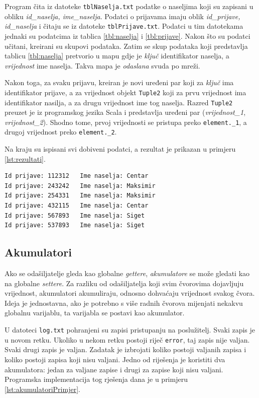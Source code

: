 \documentclass[times, utf8, zavrsni, numeric]{fer}
\begin{document}
Program čita iz datoteke \texttt{tblNaselja.txt} podatke o naseljima koji su zapisani u obliku \emph{id\_naselja, ime\_naselja}. Podatci o prijavama imaju oblik \emph{id\_prijave, id\_naselja} i čitaju se iz datoteke \texttt{tblPrijave.txt}. Podatci u tim datotekama jednaki su podatcima iz tablica \ref{tbl:naselja} i \ref{tbl:prijave}. Nakon što su podatci učitani, kreirani su skupovi podataka. Zatim se skup podataka koji predstavlja tablicu \ref{tbl:naselja} pretvorio u mapu gdje je \emph{ključ} identifikator naselja, a \emph{vrijednost} ime naselja. Takva mapa je \emph{odaslana} svuda po mreži. 

Nakon toga, za svaku prijavu, kreiran je novi uređeni par koji za \emph{ključ} ima identifikator prijave, a za vrijednost objekt \texttt{Tuple2} koji za prvu vrijednost ima identifikator nasilja, a za drugu vrijednost ime tog naselja. Razred \texttt{Tuple2} preuzet je iz programskog jezika Scala i predstavlja uređeni par (\emph{vrijednost\_1}, \emph{vrijednost\_2}). Shodno tome, prvoj vrijednosti se pristupa preko \texttt{element.\_1}, a drugoj vrijednost preko \texttt{element.\_2}.

Na kraju su ispisani svi dobiveni podatci, a rezultat je prikazan u primjeru \ref{lst:rezultati}.
\begin{lstlisting}[label={lst:rezultati}, caption={Identifikatori prijave i imena naselja odakle su prijave poslane.}]
Id prijave: 112312 	 Ime naselja: Centar
Id prijave: 243242 	 Ime naselja: Maksimir
Id prijave: 254331 	 Ime naselja: Maksimir
Id prijave: 432115 	 Ime naselja: Centar
Id prijave: 567893 	 Ime naselja: Siget
Id prijave: 537893 	 Ime naselja: Siget
\end{lstlisting}

\subsection{Akumulatori}
Ako se odašiljatelje gleda kao globalne \emph{gettere}, \emph{akumulatore}  se može gledati kao na globalne \emph{settere}. Za razliku od odašiljatelja koji svim čvorovima dojavljuju vrijednost, akumulatori akumuliraju, odnosno dohvaćaju vrijednost svakog čvora. Ideja je jednostavna, ako je potrebno s više radnih čvorova mijenjati nekakvu globalnu varijablu, ta varijabla se postavi kao akumulator.

U datoteci \texttt{log.txt} pohranjeni su zapisi pristupanju na poslužitelj. Svaki zapis je u novom retku. Ukoliko u nekom retku postoji riječ \texttt{error}, taj zapis nije valjan. Svaki drugi zapis je valjan. Zadatak je izbrojati koliko postoji valjanih zapisa i koliko postoji zapisa koji nisu valjani. Jedno od riješenja je koristiti dva akumulatora: jedan za valjane zapise i drugi za zapise koji nisu valjani. Programska implementacija tog rješenja dana je u primjeru \ref{lst:akumulatoriPrimjer}.
\end{document}
